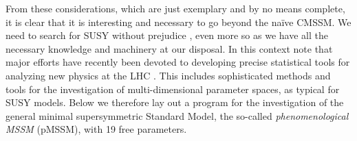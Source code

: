 From these considerations, which are just exemplary and by no means complete, 
it is clear that it is interesting and necessary to go beyond the na\"ive 
CMSSM. We need to search for SUSY without prejudice \cite{Berger:2008cq,Conley:2010du},  
even more so as we have all the necessary knowledge and machinery at 
our disposal. In this context note that major efforts have recently been 
devoted to developing precise statistical tools for analyzing new physics 
at the LHC \cite{Lyons:2003bw}. 
This includes sophisticated methods and tools for the investigation of 
multi-dimensional parameter spaces, as typical for SUSY models. 
Below we therefore lay out a program for the investigation of the 
general minimal supersymmetric Standard Model, the so-called 
{\it phenomenological MSSM} (pMSSM), with 19 free parameters. 

